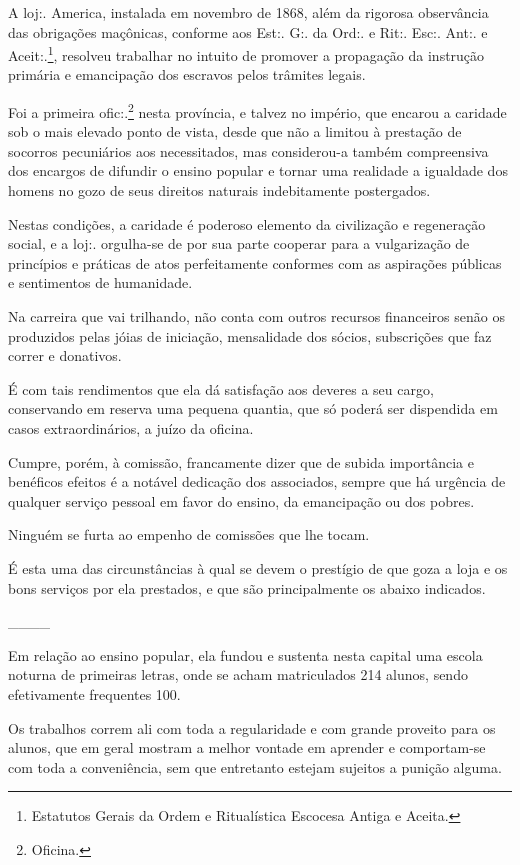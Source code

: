 {A loj:. America, instalada em novembro de 1868, além da rigorosa
observância das obrigações maçônicas, conforme aos Est:. G:. da Ord:. e
Rit:. Esc:. Ant:. e Aceit:.\footnote{ Estatutos Gerais da Ordem e
  Ritualística Escocesa Antiga e Aceita.}, resolveu trabalhar no intuito
de promover a propagação da instrução primária e emancipação dos
escravos pelos trâmites legais.

Foi a primeira ofic:.\footnote{ Oficina.} nesta província, e talvez no
império, que encarou a caridade sob o mais elevado ponto de vista, desde
que não a limitou à prestação de socorros pecuniários aos necessitados,
mas considerou-a também compreensiva dos encargos de difundir o ensino
popular e tornar uma realidade a igualdade dos homens no gozo de seus
direitos naturais indebitamente postergados.

Nestas condições, a caridade é poderoso elemento da civilização e
regeneração social, e a loj:. orgulha-se de por sua parte cooperar para
a vulgarização de princípios e práticas de atos perfeitamente conformes
com as aspirações públicas e sentimentos de humanidade.

Na carreira que vai trilhando, não conta com outros recursos financeiros
senão os produzidos pelas jóias de iniciação, mensalidade dos sócios,
subscrições que faz correr e donativos.

É com tais rendimentos que ela dá satisfação aos deveres a seu cargo,
conservando em reserva uma pequena quantia, que só poderá ser dispendida
em casos extraordinários, a juízo da oficina.

Cumpre, porém, à comissão, francamente dizer que de subida importância e
benéficos efeitos é a notável dedicação dos associados, sempre que há
urgência de qualquer serviço pessoal em favor do ensino, da emancipação
ou dos pobres.

Ninguém se furta ao empenho de comissões que lhe tocam.

É esta uma das circunstâncias à qual se devem o prestígio de que goza a
loja e os bons serviços por ela prestados, e que são principalmente os
abaixo indicados.

\_\_\_\_

Em relação ao ensino popular, ela fundou e sustenta nesta capital uma
escola noturna de primeiras letras, onde se acham matriculados 214
alunos, sendo efetivamente frequentes 100.

Os trabalhos correm ali com toda a regularidade e com grande proveito
para os alunos, que em geral mostram a melhor vontade em aprender e
comportam-se com toda a conveniência, sem que entretanto estejam
sujeitos a punição alguma.

}
